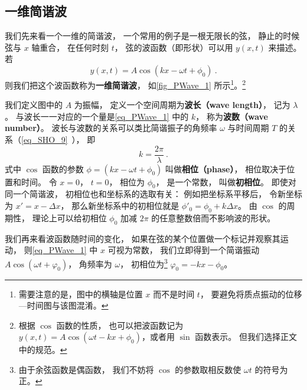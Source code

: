 \subsection{一维简谐波}
我们先来看一个一维的简谐波， 一个常用的例子是一根无限长的弦， 静止的时候弦与 $x$ 轴重合， 在任何时刻 $t$， 弦的波函数（即形状）可以用 $y(x, t)$ 来描述。 若
\begin{equation}\label{eq_PWave_1}
y(x, t) = A\cos(k x - \omega t + \phi_0)~.
\end{equation}
则我们把这个波函数称为\textbf{一维简谐波}， 如\autoref{fig_PWave_1} 所示\footnote{需要注意的是，图中的横轴是位置 $x$ 而不是时间 $t$， 要避免将质点振动的位移—时间图与该图混淆。}。\footnote{根据 $\cos$ 函数的性质， 也可以把波函数记为 $y(x, t) = A\cos(\omega t - k x + \phi_0)$，或者用 $\sin$ 函数表示。 但我们选择正文中的规范。}

我们定义图中的 $A$ 为振幅， 定义一个空间周期为\textbf{波长（wave length）}， 记为 $\lambda$。 与波长一一对应的一个量是\autoref{eq_PWave_1} 中的 $k$， 称为\textbf{波数（wave number）}。 波长与波数的关系可以类比简谐振子的角频率 $\omega$ 与时间周期 $T$ 的关系（\autoref{eq_SHO_9}~）， 即
\begin{equation}\label{eq_PWave_2}
k = \frac{2\pi}{\lambda}~.
\end{equation}
式中 $\cos$ 函数的参数 $\phi = (k x - \omega t + \phi_0)$ 叫做\textbf{相位（phase）}， 相位取决于位置和时间。 令 $x=0$， $t=0$， 相位为 $\phi_0$， 是一个常数， 叫做\textbf{初相位}。 即使对同一个简谐波， 初相位也和坐标系的选取有关： 例如把坐标系平移后， 令新坐标为 $x' = x - \Delta x$， 那么新坐标系中的初相位就是 $\phi'_0 = \phi_0 + k\Delta x$。 由 $\cos$ 的周期性， 理论上可以给初相位 $\phi_0$ 加减 $2\pi$ 的任意整数倍而不影响波的形状。

我们再来看波函数随时间的变化， 如果在弦的某个位置做一个标记并观察其运动， 则\autoref{eq_PWave_1} 中 $x$ 可视为常数， 我们立即得到一个简谐振动 $A\cos(\omega t + \varphi_0)$， 角频率为 $\omega$， 初相位为\footnote{由于余弦函数是偶函数， 我们不妨将 $\cos$ 的参数取相反数使 $\omega t$ 的符号为正。} $\varphi_0 = -kx - \phi_0$。

